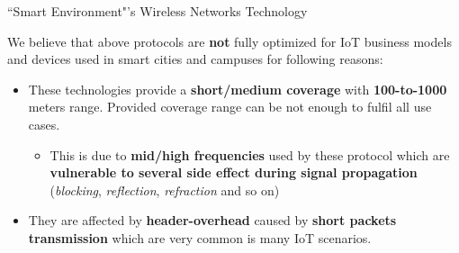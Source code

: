 \documentclass[10pt]{beamer}
\begin{document}
\begin{frame}{``Smart Environment"'s Wireless Networks Technology}

\begin{block}{}
\justifying
We believe that above protocols are \textbf{not} fully optimized for IoT business models and devices used in smart cities and campuses for following reasons:

\begin{itemize}
\justifying
\item These technologies provide a \textbf{short/medium coverage} with \textbf{100-to-1000} meters range. Provided coverage range can be not enough to fulfil all use cases.

\begin{itemize}
\item This is due to \textbf{mid/high frequencies} used by these protocol which are \textbf{vulnerable to several side effect during signal propagation} (\textit{blocking}, \textit{reflection}, \textit{refraction} and so on)
\end{itemize}

\item They are affected by \textbf{header-overhead} caused by \textbf{short packets transmission} which are very common is many IoT scenarios.

\end{itemize}
\end{block}


\end{frame} 
\end{document}
